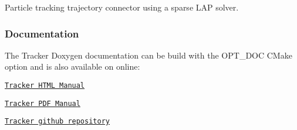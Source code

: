 Particle tracking trajectory connector using a sparse L\+AP solver.



\subsubsection*{Documentation}

The Tracker Doxygen documentation can be build with the {\ttfamily O\+P\+T\+\_\+\+D\+OC} C\+Make option and is also available on online\+:
\begin{DoxyItemize}
\item \href{https://markjolah.github.io/Tracker/index.html}{\tt Tracker H\+T\+ML Manual}
\item \href{https://markjolah.github.io/Tracker/pdf/Tracker-0.1-reference.pdf}{\tt Tracker P\+DF Manual}
\item \href{https://github.com/markjolah/Tracker}{\tt Tracker github repository} 
\end{DoxyItemize}